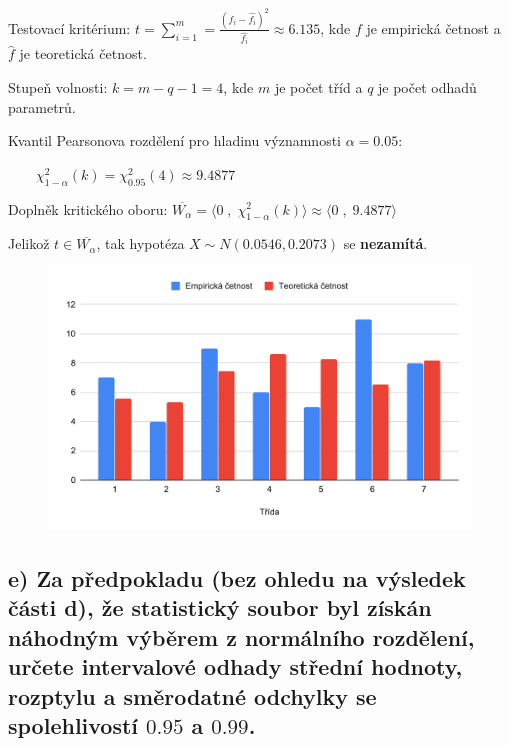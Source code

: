 \documentclass[11pt, a4paper, titlepage]{article}
\begin{document}
Testovací kritérium: ${\displaystyle t = \sum_{i=1}^{m} = \frac{(f_i - \hat{f_i})^2}{\hat{f_i}} \approx 6.135}$, kde $f$ je empirická četnost a $\hat{f}$ je teoretická četnost.
\medskip

Stupeň volnosti: ${\displaystyle k = m - q - 1 = 4}$, kde $m$ je počet tříd a $q$ je počet odhadů parametrů.
\medskip

Kvantil Pearsonova rozdělení pro hladinu významnosti ${\displaystyle \alpha = 0.05}$:
\medskip

${\displaystyle \qquad \chi_{1 - \alpha}^2(k) = \chi_{0.95}^2(4) \approx 9.4877}$
\medskip

Doplněk kritického oboru: ${\displaystyle \overline{W_\alpha} = \big\langle 0 \;,\; \chi_{1 - \alpha}^2(k) \big\rangle \approx \big\langle 0 \;,\; 9.4877 \big\rangle}$
\medskip

Jelikož ${\displaystyle t \in \overline{W_\alpha}}$, tak hypotéza ${\displaystyle X \sim N(0.0546, 0.2073)}$ se \textbf{nezamítá}.
\bigskip

\begin{figure}[H]
    \centering
    \includegraphics[width=.98\linewidth]{images/1-d-3.pdf}
\end{figure}

\newpage


\subsection*{e) Za předpokladu (bez ohledu na výsledek části d), že statistický soubor byl získán náhodným výběrem z normálního rozdělení, určete intervalové odhady střední hodnoty, rozptylu a směrodatné odchylky se spolehlivostí $0.95$ a $0.99$.}
\bigskip
\end{document}
